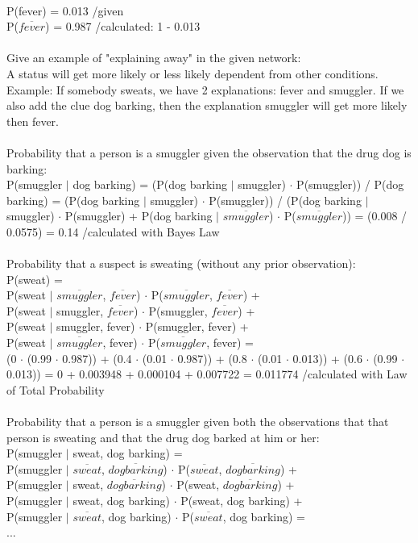 \documentclass[10pt,a4paper]{article}
\begin{document}
\\
P(fever) = 0.013 \qquad	/given \\
P($\overline{fever}$) = 0.987 \qquad /calculated: 1 - 0.013 \\
\\
Give an example of "explaining away" in the given network: \\
A status will get more likely or less likely dependent from other conditions. Example: If somebody sweats, we have 2 explanations: fever and smuggler. If we also add the clue dog barking, then the explanation smuggler will get more likely then fever. \\
\\
Probability that a person is a smuggler given the observation that the drug
dog is barking: \\
P(smuggler $|$ dog barking) = (P(dog barking $|$ smuggler) $\cdot$ P(smuggler)) / P(dog barking) = (P(dog barking $|$ smuggler) $\cdot$ P(smuggler)) / (P(dog barking $|$ smuggler) $\cdot$ P(smuggler) + P(dog barking $|$ $\overline{smuggler}$) $\cdot$ P($\overline{smuggler}$)) = (0.008 / 0.0575) = 0.14  \qquad /calculated with Bayes Law \\
\\
Probability that a suspect is sweating (without any prior observation): \\
P(sweat) = \\ P(sweat $|$ $\overline{smuggler}$, $\overline{fever}$) $\cdot$ P($\overline{smuggler}$, $\overline{fever}$) + \\ P(sweat $|$ smuggler, $\overline{fever}$) $\cdot$ P(smuggler, $\overline{fever}$) + \\ P(sweat $|$ smuggler, fever) $\cdot$ P(smuggler, fever) + \\P(sweat $|$ $\overline{smuggler}$, fever) $\cdot$ P($\overline{smuggler}$, fever) = \\ (0 $\cdot$ (0.99 $\cdot$ 0.987)) + (0.4 $\cdot$ (0.01 $\cdot$ 0.987)) + (0.8 $\cdot$ (0.01 $\cdot$ 0.013)) + (0.6 $\cdot$ (0.99 $\cdot$ 0.013)) = 0 + 0.003948 + 0.000104 + 0.007722 = 0.011774 \qquad /calculated with Law of Total Probability\\
\\
Probability that a person is a smuggler given both the observations that
that person is sweating and that the drug dog barked at him or her: \\
P(smuggler $|$ sweat, dog barking) = \\
 P(smuggler $|$ $\overline{sweat}$, $\overline{dog barking}$) $\cdot$ P($\overline{sweat}$, $\overline{dog barking}$) + \\ P(smuggler $|$ sweat, $\overline{dog barking}$) $\cdot$ P(sweat, $\overline{dog barking}$) + \\ P(smuggler $|$ sweat, dog barking) $\cdot$ P(sweat, dog barking) + \\P(smuggler $|$ $\overline{sweat}$, dog barking) $\cdot$ P($\overline{sweat}$, dog barking) = \\ 
... \\
\end{document}
